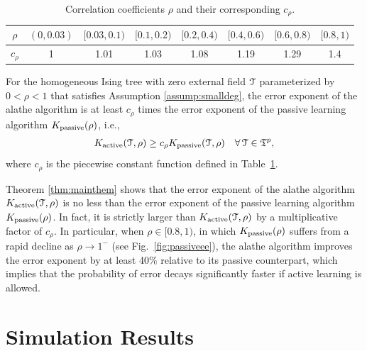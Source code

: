 \begin{table}[t]
	\normalsize
	\centering
	\begin{tabular}{|c|c|c|c|c|c|c|c|}
	\hline
	$\rho$ & $(0,0.03)$ & $[0.03,0.1)$ & $[0.1,0.2)$ & $[0.2,0.4)$ & $[0.4,0.6)$ & $[0.6,0.8)$ & $[0.8,1)$\\
	\hline
	$c_{\rho}$ & 1 & 1.01 & 1.03 & 1.08 & 1.19& 1.29 & 1.4 \\
	\hline
	\end{tabular}
	\caption{Correlation coefficients $\rho$ and their corresponding $c_{\rho}$.}
	\label{table:crho}
\end{table}

\begin{theorem}\label{thm:mainthem}
	For the homogeneous Ising tree with zero external field $\mathcal{T}$ parameterized by $0<\rho<1$ that satisfies Assumption \ref{assump:smalldeg}, the error exponent of the \ac{alathe} algorithm is at least $c_{\rho}$ times the 
	error exponent of the passive learning algorithm $K _{{\rm passive}}(\rho)$, i.e.,
	\begin{align}
		K _{{\rm active}}(\mathcal{T},\rho)\geq c_{\rho}K _{{\rm passive}}(\mathcal{T},\rho) \quad \forall\, \mathcal{T}\in\mathfrak{T}^{p},
	\end{align}
	where $c_{\rho}$ is the piecewise constant function   defined in Table~\ref{table:crho}.
\end{theorem} 
Theorem \ref{thm:mainthem} shows that the error exponent of the \ac{alathe} algorithm $K _{{\rm active}}(\mathcal{T},\rho)$ is no less than the error exponent of the passive learning algorithm $K _{{\rm passive}}(\rho)$. In fact, it is strictly larger than $K _{{\rm active}}(\mathcal{T},\rho)$ by a multiplicative factor of $c_{\rho}$. In particular, when 
$\rho\in[0.8,1)$, in which $K _{{\rm passive}}(\rho)$ suffers from a rapid decline as $\rho\to 1^-$ (see Fig.~\ref{fig:passiveee}), the \ac{alathe} algorithm improves the error exponent by at least 40\% relative to  its passive counterpart, which implies that the probability of error decays significantly faster if active learning is allowed. 

\section{Simulation Results} \label{sec:sim}

